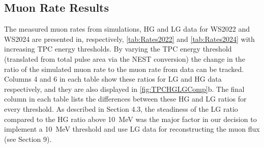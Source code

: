 \subsection{Muon Rate Results}
The measured muon rates from simulations, HG and LG data for WS2022 and WS2024 are presented in, respectively, \autoref{tab:Rates2022} and \autoref{tab:Rates2024} with increasing TPC energy thresholds. By varying the TPC energy threshold (translated from total pulse area via the NEST conversion) the change in the ratio of the simulated muon rate to the muon rate from data can be tracked. Columns 4 and 6 in each table show these ratios for LG and HG data respectively, and they are also displayed in \autoref{fig:TPCHGLGComp}b. The final column in each table lists the differences between these HG and LG ratios for every threshold. As described in Section 4.3, the steadiness of the LG ratio compared to the HG ratio above 10~MeV was the major factor in our decision to implement a 10~MeV threshold and use LG data for reconstructing the muon flux (see Section 9).

